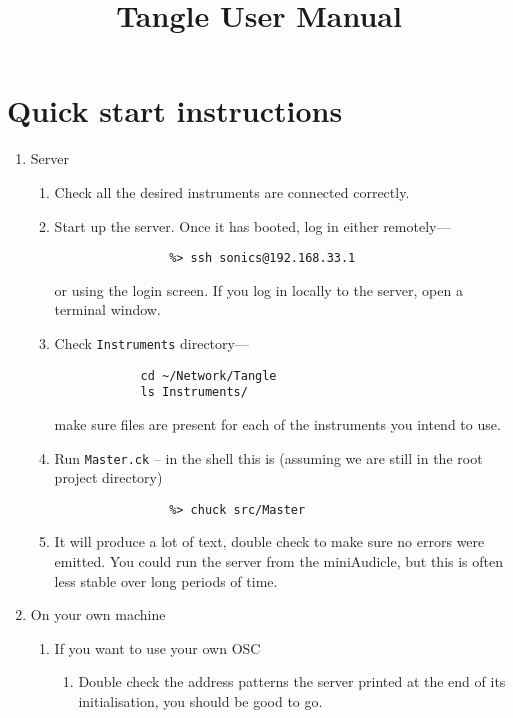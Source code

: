 \documentclass[11pt]{article}
\begin{document}
\title{Tangle User Manual}
\maketitle

\tableofcontents
\newpage
\section{Quick start instructions}
\begin{enumerate} [\bf 1.]
\item {\large Server}
	\begin{enumerate} [\bf i.]

		\item{Check all the desired instruments are connected correctly.}
		\item{Start up the server. Once it has booted, log in either remotely---
		\begin{verbatim}
			    %> ssh sonics@192.168.33.1
		\end{verbatim}                                 
		or using the login screen. If you log in locally to the server, open a terminal window.}
		\item{Check \texttt{Instruments} directory---
		\begin{verbatim}
			cd ~/Network/Tangle
			ls Instruments/
		\end{verbatim}
		make sure files are present for each of the instruments you intend to use.}
		\item Run \texttt{Master.ck} -- in the shell this is (assuming we are still in the root project directory)
		\begin{verbatim}
			    %> chuck src/Master
		\end{verbatim}
		\item  It will produce a lot of text, double check to make sure no errors were emitted. You could run the 
			  server from the miniAudicle, but this is often less stable over long periods of time.
	\end{enumerate}
\item {\large On your own machine}
	\begin{enumerate} [\bf i.]
		\item {If you want to use your own OSC}
		\begin{enumerate} [\bf a.]
			\item{Double check the address patterns the server printed at the end of its initialisation, you should be good to go.}
		\end{enumerate}

\end{enumerate}
\end{enumerate}
\end{document}
